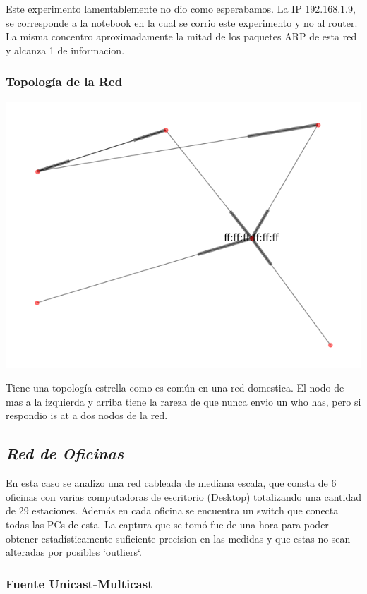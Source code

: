 Este experimento lamentablemente no dio como esperabamos. La IP 192.168.1.9, se corresponde
a la notebook en la cual se corrio este experimento y no al router. La misma concentro aproximadamente
la mitad de los paquetes ARP de esta red y alcanza 1 de informacion.

\subsubsection{Topolog\'ia de la Red}
\begin{center}
 \includegraphics[scale=0.6]{../plots/mauro_s2_topologia.png}
\end{center}

Tiene una topolog\'ia estrella como es com\'un en una red domestica. El nodo de mas a la izquierda y
arriba tiene la rareza de que nunca envio un who has, pero si respondio is at a dos nodos de la red.

\subsection{\emph{Red de Oficinas}}

En esta caso se analizo una red cableada de mediana escala, que consta de 6
oficinas con varias computadoras de escritorio (Desktop) totalizando una
cantidad de 29 estaciones. Además en cada oficina se encuentra un switch que
conecta todas las PCs de esta. La captura que se tomó fue de una hora para
poder obtener estadísticamente suficiente precision en las medidas y que estas
no sean alteradas por posibles `outliers`.

\subsubsection{Fuente Unicast-Multicast}

